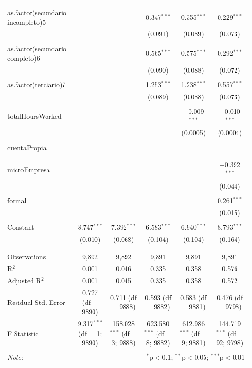 \documentclass[12pt,a4paper,onecolumn]{article}
\begin{document}
\begin{table}[!htbp]
{\begin{tabular}{@{\extracolsep{5pt}}lccccc}
  & & & & & \\ 
 as.factor(secundario incompleto)5 &  &  & 0.347$^{***}$ & 0.355$^{***}$ & 0.229$^{***}$ \\ 
  &  &  & (0.091) & (0.089) & (0.073) \\ 
  & & & & & \\ 
 as.factor(secundario completo)6 &  &  & 0.565$^{***}$ & 0.575$^{***}$ & 0.292$^{***}$ \\ 
  &  &  & (0.090) & (0.088) & (0.072) \\ 
  & & & & & \\ 
 as.factor(terciario)7 &  &  & 1.253$^{***}$ & 1.238$^{***}$ & 0.557$^{***}$ \\ 
  &  &  & (0.089) & (0.088) & (0.073) \\ 
  & & & & & \\ 
 totalHoursWorked &  &  &  & $-$0.009$^{***}$ & $-$0.010$^{***}$ \\ 
  &  &  &  & (0.0005) & (0.0004) \\ 
  & & & & & \\ 
 cuentaPropia &  &  &  &  &  \\ 
  &  &  &  &  &  \\ 
  & & & & & \\ 
 microEmpresa &  &  &  &  & $-$0.392$^{***}$ \\ 
  &  &  &  &  & (0.044) \\ 
  & & & & & \\ 
 formal &  &  &  &  & 0.261$^{***}$ \\ 
  &  &  &  &  & (0.015) \\ 
  & & & & & \\ 
 Constant & 8.747$^{***}$ & 7.392$^{***}$ & 6.583$^{***}$ & 6.940$^{***}$ & 8.793$^{***}$ \\ 
  & (0.010) & (0.068) & (0.104) & (0.104) & (0.164) \\ 
  & & & & & \\ 
\hline \\[-1.8ex] 
Observations & 9,892 & 9,892 & 9,891 & 9,891 & 9,891 \\ 
R$^{2}$ & 0.001 & 0.046 & 0.335 & 0.358 & 0.576 \\ 
Adjusted R$^{2}$ & 0.001 & 0.045 & 0.335 & 0.358 & 0.572 \\ 
Residual Std. Error & 0.727 (df = 9890) & 0.711 (df = 9888) & 0.593 (df = 9882) & 0.583 (df = 9881) & 0.476 (df = 9798) \\ 
F Statistic & 9.317$^{***}$ (df = 1; 9890) & 158.028$^{***}$ (df = 3; 9888) & 623.580$^{***}$ (df = 8; 9882) & 612.986$^{***}$ (df = 9; 9881) & 144.719$^{***}$ (df = 92; 9798) \\ 
\hline 
\hline \\[-1.8ex] 
\textit{Note:}  & \multicolumn{5}{r}{$^{*}$p$<$0.1; $^{**}$p$<$0.05; $^{***}$p$<$0.01} \\ 
\end{tabular} 
} 
\end{table}
\end{document}

